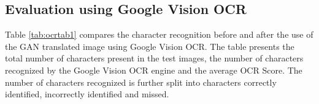 \subsection{Evaluation using Google Vision OCR}
	Table \ref{tab:ocrtab1} compares the character recognition before and after the use of the GAN translated image using Google Vision OCR. The table presents the total number of characters present in the test images, the number of characters recognized by the Google Vision OCR engine and the average OCR Score. The number of characters recognized is further split into characters correctly identified, incorrectly identified and missed.

\begin{table}[H]
\caption{Character recognition with and without GAN using Google Vision OCR engine}
\label{tab:ocrtab1}
\end{table}

